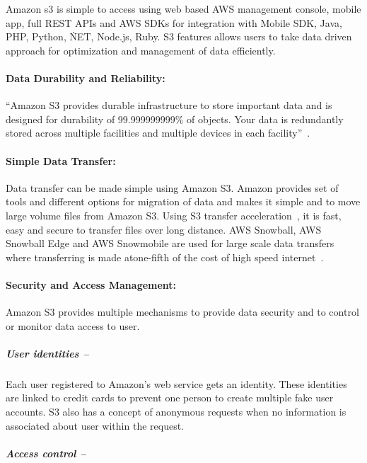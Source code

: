 Amazon s3 is simple to access using web based AWS management console, mobile
app, full REST APIs and AWS SDKs for integration with Mobile SDK, Java, PHP,
Python, \.NET,
Node.js, Ruby. S3 features allows users to take data driven
approach for optimization and management of data efficiently.



\paragraph{Data Durability and Reliability:} 

``Amazon S3 provides durable infrastructure to store important data and is
designed for durability of 99.999999999\% of objects. Your data is redundantly
stored across multiple facilities and multiple devices in each
facility''~\cite{hid-sp18-420-amazon-S3}.

\paragraph{Simple Data Transfer:} 

Data transfer can be made simple using Amazon S3. Amazon provides set of tools
and different options for migration of data and makes it simple and to move
large volume files from Amazon S3. Using S3 transfer
acceleration~\cite{hid-sp18-420-amazon-S3-dataTransfer-FAQ}, it is fast, easy
and secure to
transfer files over long distance. AWS Snowball, AWS Snowball Edge and AWS
Snowmobile are used for large scale data transfers where transferring is made
atone-fifth of the cost of high speed
internet~\cite{hid-sp18-420-amazon-S3-cloud-migration}.

\paragraph{Security and Access Management:} 

Amazon S3 provides multiple mechanisms to provide data security and to control
or monitor data access to user.
\subparagraph{User identities – }

Each user registered to Amazon’s web service gets an identity. These identities
are linked to credit cards to prevent one person to create multiple fake user
accounts. S3 also has a concept of anonymous requests when no information is
associated about user within the request.
\subparagraph{Access control –}

